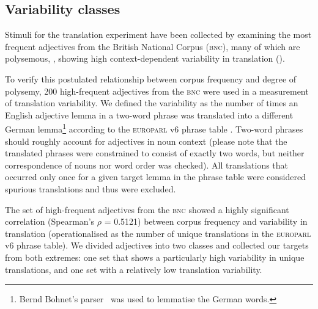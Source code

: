 \documentclass[output=paper]{LSP/langsci}
\begin{document}






\subsection{Variability classes}  

Stimuli for the translation experiment have been collected by
examining the most frequent adjectives from the British National
Corpus (\textsc{bnc}), many of which are polysemous, \ie, showing high
context-dependent variability in translation
(). 

To verify this postulated relationship between corpus frequency and
degree of polysemy, 200 high-frequent adjectives from the \textsc{bnc}
were used in a measurement of translation variability. We defined the
variability as the number of times an English adjective lemma in a
two-word phrase was translated into a different German
lemma\footnote{Bernd Bohnet's parser~\citep{bohnet:2010:PAPERS} was
  used to lemmatise the German words.} according to the
\textsc{europarl} v6 phrase table \citep[see][]{Koehn:05}. Two-word
phrases should roughly account for adjectives in noun context (please
note that the translated phrases were constrained to consist of
exactly two words, but neither correspondence of nouns nor word order
was checked). All translations that occurred only once for a given
target lemma in the phrase table were considered spurious translations and
thus were excluded.

The set of high-frequent adjectives from the \textsc{bnc} showed a
highly significant correlation (Spearman's $\rho$ = 0.5121)
between corpus frequency and variability in translation
(operationalised as the number of unique translations in the
\textsc{europarl} v6 phrase table). We divided adjectives into two
classes and collected our targets from both extremes: one set that
shows a particularly high variability in unique translations, and one
set with a relatively low translation variability.

\end{document}
